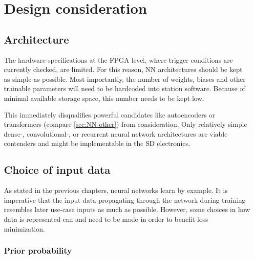 \section{Design consideration}
\label{sec:design-considerations}

\subsection{Architecture}
\label{ssec:architecture}

The hardware specifications at the FPGA level, where trigger conditions are currently checked, are limited. For this reason, NN architectures should be kept as 
simple as possible. Most importantly, the number of weights, biases and other trainable parameters will need to be hardcoded into station software. Because of 
minimal available storage space, this number needs to be kept low.

This immediately disqualifies powerful candidates like autoencoders or transformers (compare \autoref{sec:NN-other}) from consideration. Only  relatively simple 
dense-, convolutional-, or recurrent neural network architectures are viable contenders and might be implementable in the SD electronics.

\subsection{Choice of input data}
\label{ssec:input-data}

As stated in the previous chapters, neural networks learn by example. It is imperative that the input data propagating through the network during training 
resembles later use-case inputs as much as possible. However, some choices in how data is represented can and need to be made in order to benefit loss 
minimization. 

\subsubsection{Prior probability}
\label{sssec:prior-discussion}

